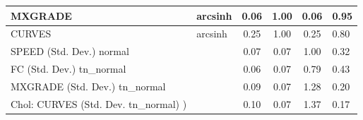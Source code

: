 \begin{table}
\begin{center}
\begin{tabular}{|l|l|c|c|c|l|}
			\hline
			MXGRADE & arcsinh & 0.06 & 1.00 & 0.06 & 0.95 \\
			\hline
			CURVES & arcsinh & 0.25 & 1.00 & 0.25 & 0.80 \\
			\hline
			SPEED (Std. Dev.) normal &  & 0.07 & 0.07 & 1.00 & 0.32 \\
			\hline
			FC (Std. Dev.) tn_normal &  & 0.06 & 0.07 & 0.79 & 0.43 \\
			\hline
			MXGRADE (Std. Dev.) tn_normal &  & 0.09 & 0.07 & 1.28 & 0.20 \\
			\hline
			 Chol: CURVES (Std. Dev. tn_normal) ) &  & 0.10 & 0.07 & 1.37 & 0.17 \\
			\hline
		\end{tabular}
	\end{center}
\end{table}